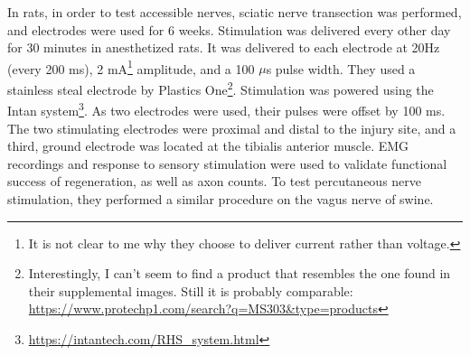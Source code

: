 In rats, in order to test accessible nerves, sciatic nerve transection was performed, and electrodes were used for 6 weeks. Stimulation was delivered every other day for 30 minutes in anesthetized rats. It was delivered to each electrode at 20Hz (every 200 ms), 2 mA\footnote{It is not clear to me why they choose to deliver current rather than voltage.} amplitude, and a 100 $\mu$s pulse width. They used a stainless steal electrode by Plastics One\footnote{Interestingly, I can't seem to find a product that resembles the one found in their supplemental images. Still it is probably comparable: \url{https://www.protechp1.com/search?q=MS303\&type=products}}. Stimulation was powered using the Intan system\footnote{\url{https://intantech.com/RHS_system.html}}. As two electrodes were used, their pulses were offset by 100 ms. The two stimulating electrodes were proximal and distal to the injury site, and a third, ground electrode was located at the tibialis anterior muscle. EMG recordings and response to sensory stimulation were used to validate functional success of regeneration, as well as axon counts. To test percutaneous nerve stimulation, they performed a similar procedure on the vagus nerve of swine.  








